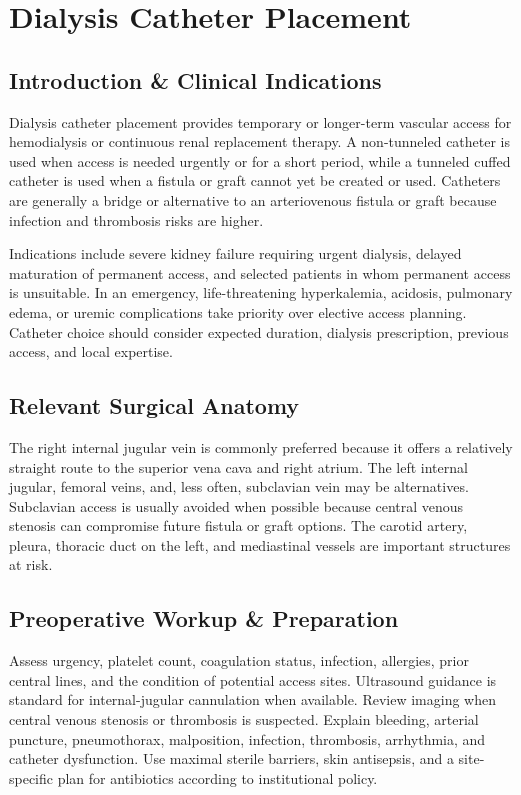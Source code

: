 \chapter{Dialysis Catheter Placement}

\section*{Introduction \& Clinical Indications}
Dialysis catheter placement provides temporary or longer-term vascular access for hemodialysis or continuous renal replacement therapy. A non-tunneled catheter is used when access is needed urgently or for a short period, while a tunneled cuffed catheter is used when a fistula or graft cannot yet be created or used. Catheters are generally a bridge or alternative to an arteriovenous fistula or graft because infection and thrombosis risks are higher.

Indications include severe kidney failure requiring urgent dialysis, delayed maturation of permanent access, and selected patients in whom permanent access is unsuitable. In an emergency, life-threatening hyperkalemia, acidosis, pulmonary edema, or uremic complications take priority over elective access planning. Catheter choice should consider expected duration, dialysis prescription, previous access, and local expertise.

\section*{Relevant Surgical Anatomy}
The right internal jugular vein is commonly preferred because it offers a relatively straight route to the superior vena cava and right atrium. The left internal jugular, femoral veins, and, less often, subclavian vein may be alternatives. Subclavian access is usually avoided when possible because central venous stenosis can compromise future fistula or graft options. The carotid artery, pleura, thoracic duct on the left, and mediastinal vessels are important structures at risk.

\section*{Preoperative Workup \& Preparation}
Assess urgency, platelet count, coagulation status, infection, allergies, prior central lines, and the condition of potential access sites. Ultrasound guidance is standard for internal-jugular cannulation when available. Review imaging when central venous stenosis or thrombosis is suspected. Explain bleeding, arterial puncture, pneumothorax, malposition, infection, thrombosis, arrhythmia, and catheter dysfunction. Use maximal sterile barriers, skin antisepsis, and a site-specific plan for antibiotics according to institutional policy.

